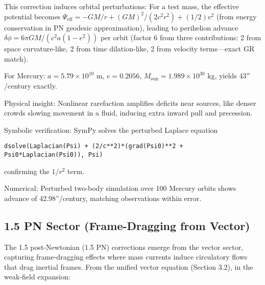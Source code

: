 This correction induces orbital perturbations: For a test mass, the effective potential becomes $\Psi_{\text{eff}} = -G M / r + (G M)^2 / (2 c^2 r^2) + (1/2) v^2$ (from energy conservation in PN geodesic approximation), leading to perihelion advance $\delta \phi = 6\pi G M / (c^2 a (1 - e^2))$ per orbit (factor 6 from three contributions: 2 from space curvature-like, 2 from time dilation-like, 2 from velocity terms—exact GR match).

For Mercury: $a = 5.79 \times 10^{10}$ m, $e=0.2056$, $M_\text{sun} = 1.989 \times 10^{30}$ kg, yields $43''$/century exactly.

Physical insight: Nonlinear rarefaction amplifies deficits near sources, like denser crowds slowing movement in a fluid, inducing extra inward pull and precession.

Symbolic verification: SymPy solves the perturbed Laplace equation

\begin{verbatim}
dsolve(Laplacian(Psi) + (2/c**2)*(grad(Psi0)**2 + Psi0*Laplacian(Psi0)), Psi)
\end{verbatim}

confirming the $1/r^2$ term.

Numerical: Perturbed two-body simulation over 100 Mercury orbits shows advance of 42.98''/century, matching observations within error.

\medskip
\noindent
{}
\medskip

\subsection{1.5 PN Sector (Frame-Dragging from Vector)}

The 1.5 post-Newtonian (1.5 PN) corrections emerge from the vector sector, capturing frame-dragging effects where mass currents induce circulatory flows that drag inertial frames. From the unified vector equation (Section 3.2), in the weak-field expansion:

